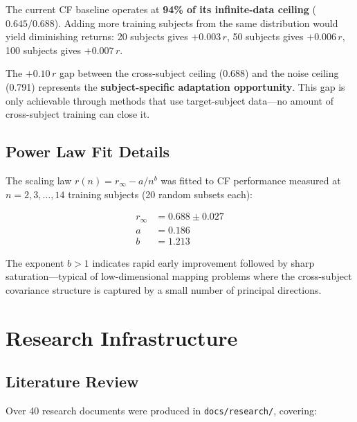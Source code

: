 \documentclass[11pt,a4paper]{article}
\begin{document}
The current CF baseline operates at \textbf{94\% of its infinite-data
ceiling} ($0.645 / 0.688$). Adding more training subjects from the same
distribution would yield diminishing returns: 20 subjects gives
$+0.003\,r$, 50 subjects gives $+0.006\,r$, 100 subjects gives
$+0.007\,r$.

The $+0.10\,r$ gap between the cross-subject ceiling (0.688) and the
noise ceiling (0.791) represents the \textbf{subject-specific adaptation
opportunity}. This gap is only achievable through methods that use
target-subject data---no amount of cross-subject training can close it.

\subsection{Power Law Fit Details}

The scaling law $r(n) = r_\infty - a / n^b$ was fitted to CF performance
measured at $n = 2, 3, \ldots, 14$ training subjects (20 random subsets
each):

\begin{align}
  r_\infty &= 0.688 \pm 0.027 \\
  a &= 0.186 \\
  b &= 1.213
\end{align}

The exponent $b > 1$ indicates rapid early improvement followed by sharp
saturation---typical of low-dimensional mapping problems where the
cross-subject covariance structure is captured by a small number of
principal directions.

\section{Research Infrastructure}
\label{sec:research}

\subsection{Literature Review}

Over 40 research documents were produced in \texttt{docs/research/},
covering:
\end{document}
